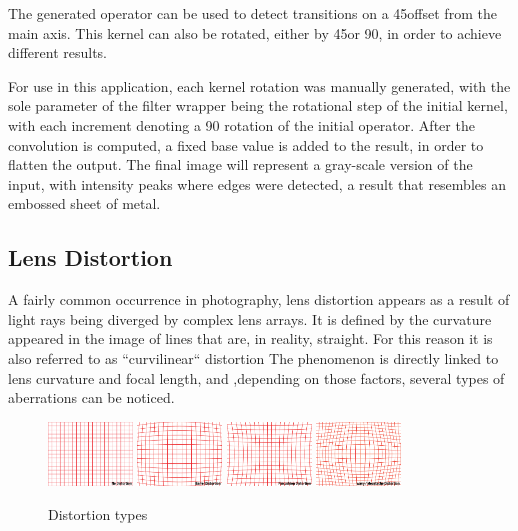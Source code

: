 The generated operator can be used to detect transitions on a 45\textdegree offset from the main axis. This
kernel can also be rotated, either by 45\textdegree or 90\textdegree, in order to achieve different results.

For use in this application, each kernel rotation was manually generated, with the sole parameter of the
filter wrapper being the rotational step of the initial kernel, with each increment denoting a 90\textdegree
rotation of the initial operator. After the convolution is computed, a fixed base value is added to the
result, in order to flatten the output. The final image will represent a gray-scale version of the input,
with intensity peaks where edges were detected, a result that resembles an embossed sheet of metal.

\subsection{Lens Distortion}

A fairly common occurrence in photography, lens distortion appears as a result of light rays being diverged
by complex lens arrays. It is defined by the curvature appeared in the image of lines that are, in reality,
straight. For this reason it is also referred to as ``curvilinear`` distortion The phenomenon is directly
linked to lens curvature and focal length, and ,depending on those factors, several types of aberrations
can be noticed. \cite{lensImages}
\begin{figure}[H]
	\label{fig:distortionTypes}
	\includegraphics[width=0.2\textwidth, height=0.2\textwidth]{resources/No-Distortion.png}
	\includegraphics[width=0.2\textwidth, height=0.2\textwidth]{resources/Barrel-Distortion.png}
	\includegraphics[width=0.2\textwidth, height=0.2\textwidth]{resources/Pincushion-Distortion.png}
	\includegraphics[width=0.2\textwidth, height=0.2\textwidth]{resources/Wavy-Moustache-Distortion.png}
	\caption{Distortion types \cite{lensImages}}
\end{figure}

